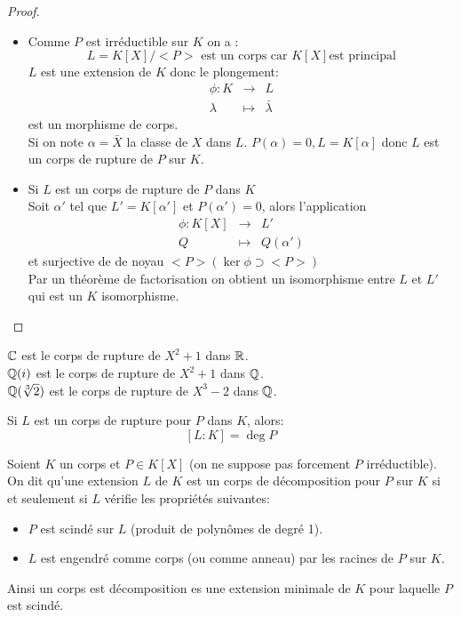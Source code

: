 \begin{proof}

	\begin{itemize}
		\item Comme $P$ est irréductible sur $K$ on a :
		      $$ L = K[X]/<P> \text{ est un corps car } K[X] \text{est principal}$$
		      $L$ est une extension de $K$ donc le plongement:
		      \begin{eqnarray*}
			      \phi: K &\to& L\\
			      \lambda   &\mapsto &\bar{\lambda}
		      \end{eqnarray*}
		      est un morphisme de corps.\\
		      Si on note $\alpha = \bar{X}$ la classe de $X$ dans $L$. $P(\alpha) = 0, L = K[\alpha]$
		      donc $L$ est un corps de rupture de $P$ sur $K$.
		\item Si $L$ est un corps de rupture de $P$ dans $K$ \\
		      Soit $\alpha'$ tel que $L' = K[\alpha']$ et $P(\alpha') = 0$, alors l'application
		      \begin{eqnarray*}
			      \phi : K[X] &\to& L'\\
			      Q &   \mapsto & Q(\alpha')
		      \end{eqnarray*}
		      et surjective de de noyau $<P> (\ker \phi \supset <P>)$\\
		      Par un théorème de factorisation on obtient un isomorphisme entre $L$ et $L'$ qui est un $K$ isomorphisme.
	\end{itemize}
\end{proof}

\begin{example}
	$\mathbb{C}$ est le corps de rupture de $X^2+1$ dans $\mathbb{R}$.\\
	$\mathbb{Q}(i)$ est le corps de rupture de $X^2+1$ dans $\mathbb{Q}$.\\
	$\mathbb{Q}(\sqrt[3]{2})$ est le corps de rupture de $X^3-2$ dans $\mathbb{Q}$.\\
\end{example}

\begin{remarque}[Important]
	Si $L$ est un corps de rupture pour $P$ dans $K$, alors:
	$$ [L : K] = \deg P$$
\end{remarque}


\begin{definition}
	Soient $K$ un corps et $P\in K[X]$ (on ne suppose pas forcement $P$ irréductible).\\
	On dit qu'une extension $L$ de $K$ est un corps de décomposition pour $P$ sur $K$ si et seulement si $L$ vérifie les propriétés suivantes:
	\begin{itemize}
		\item $P$ est scindé sur $L$ (produit de polynômes de degré 1).
		\item $L$ est engendré comme corps (ou comme anneau) par les racines de $P$ sur $K$.
	\end{itemize}

	Ainsi un corps est décomposition es une extension minimale de $K$ pour laquelle $P$ est scindé.
\end{definition}


